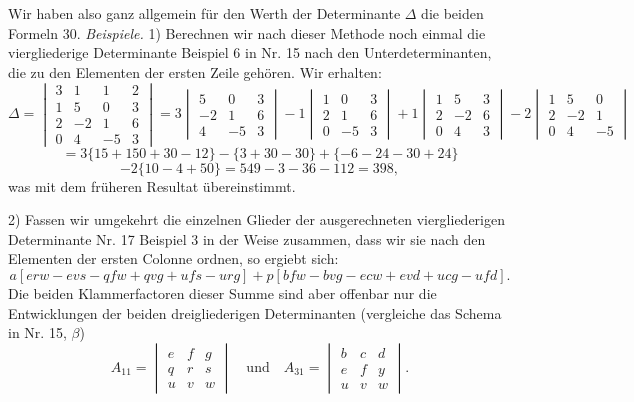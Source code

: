 Wir haben also ganz allgemein für den Werth der Determinante $\Delta$ die
beiden Formeln
30. \textit{Beispiele.} 1) Berechnen wir nach dieser Methode noch einmal die
viergliederige Determinante Beispiel 6 in Nr. 15 nach den
Unterdeterminanten, die zu den Elementen der ersten Zeile gehören. Wir
erhalten:
\[
\Delta=\begin{vmatrix} 3 & 1 & 1 & 2 \\ 1 & 5 & 0 & 3 \\ 2 & -2 & 1 & 6 \\ 0 & 4 & -5 & 3 \end{vmatrix}
=3\begin{vmatrix} 5 & 0 & 3 \\ -2 & 1 & 6 \\ 4 & -5 & 3 \end{vmatrix}
-1\begin{vmatrix} 1 & 0 & 3 \\ 2 & 1 & 6 \\ 0 & -5 & 3 \end{vmatrix}
+1\begin{vmatrix} 1 & 5 & 3 \\ 2 & -2 & 6 \\ 0 & 4 & 3 \end{vmatrix}
-2\begin{vmatrix} 1 & 5 & 0 \\ 2 & -2 & 1 \\ 0 & 4 & -5 \end{vmatrix}
\]
\[
=3\{15+150+30-12\}-\{3+30-30\}+\{-6-24-30+24\}
\]
\[
-2\{10-4+50\}=549-3-36-112=398,
\]
was mit dem früheren Resultat übereinstimmt.

2) Fassen wir umgekehrt die einzelnen Glieder der ausgerechneten
viergliederigen Determinante Nr. 17 Beispiel 3 in der Weise zusammen, dass
wir sie nach den Elementen der ersten Colonne ordnen, so ergiebt sich:
\[
a[erw-evs-qfw+qvg+ufs-urg] %
+p[bfw-bvg-ecw+evd+ucg-ufd].
\]
Die beiden Klammerfactoren dieser Summe sind aber offenbar nur die
Entwicklungen der beiden dreigliederigen Determinanten (vergleiche das
Schema in Nr. 15, $\beta$)
\[
A_{11}=\begin{vmatrix} e & f & g \\ q & r & s \\ u & v & w \end{vmatrix}
\quad \text{und} \quad
A_{31}=\begin{vmatrix} b & c & d \\ e & f & y \\ u & v & w \end{vmatrix}.
\]


